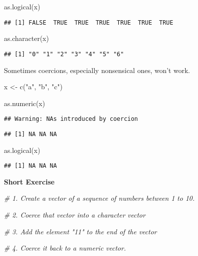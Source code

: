 \documentclass[
]{book}
\newenvironment{Shaded}{\begin{snugshade}}{\end{snugshade}}
\newcommand{\CommentTok}[1]{\textcolor[rgb]{0.56,0.35,0.01}{\textit{#1}}}
\newcommand{\FunctionTok}[1]{\textcolor[rgb]{0.00,0.00,0.00}{#1}}
\newcommand{\NormalTok}[1]{#1}
\newcommand{\OtherTok}[1]{\textcolor[rgb]{0.56,0.35,0.01}{#1}}
\newcommand{\StringTok}[1]{\textcolor[rgb]{0.31,0.60,0.02}{#1}}
\begin{document}
\begin{Shaded}
\begin{Highlighting}[]
\FunctionTok{as.logical}\NormalTok{(x)}
\end{Highlighting}
\end{Shaded}

\begin{verbatim}
## [1] FALSE  TRUE  TRUE  TRUE  TRUE  TRUE  TRUE
\end{verbatim}

\begin{Shaded}
\begin{Highlighting}[]
\FunctionTok{as.character}\NormalTok{(x)}
\end{Highlighting}
\end{Shaded}

\begin{verbatim}
## [1] "0" "1" "2" "3" "4" "5" "6"
\end{verbatim}

Sometimes coercions, especially nonsensical ones, won't work.

\begin{Shaded}
\begin{Highlighting}[]
\NormalTok{x }\OtherTok{\textless{}{-}} \FunctionTok{c}\NormalTok{(}\StringTok{"a"}\NormalTok{, }\StringTok{"b"}\NormalTok{, }\StringTok{"c"}\NormalTok{)}

\FunctionTok{as.numeric}\NormalTok{(x)}
\end{Highlighting}
\end{Shaded}

\begin{verbatim}
## Warning: NAs introduced by coercion
\end{verbatim}

\begin{verbatim}
## [1] NA NA NA
\end{verbatim}

\begin{Shaded}
\begin{Highlighting}[]
\FunctionTok{as.logical}\NormalTok{(x)}
\end{Highlighting}
\end{Shaded}

\begin{verbatim}
## [1] NA NA NA
\end{verbatim}

\textbf{Short Exercise}

\begin{Shaded}
\begin{Highlighting}[]
\CommentTok{\# 1. Create a vector of a sequence of numbers between 1 to 10.}

\CommentTok{\# 2. Coerce that vector into a character vector}

\CommentTok{\# 3. Add the element "11" to the end of the vector}

\CommentTok{\# 4. Coerce it back to a numeric vector.}
\end{Highlighting}
\end{Shaded}
\end{document}
